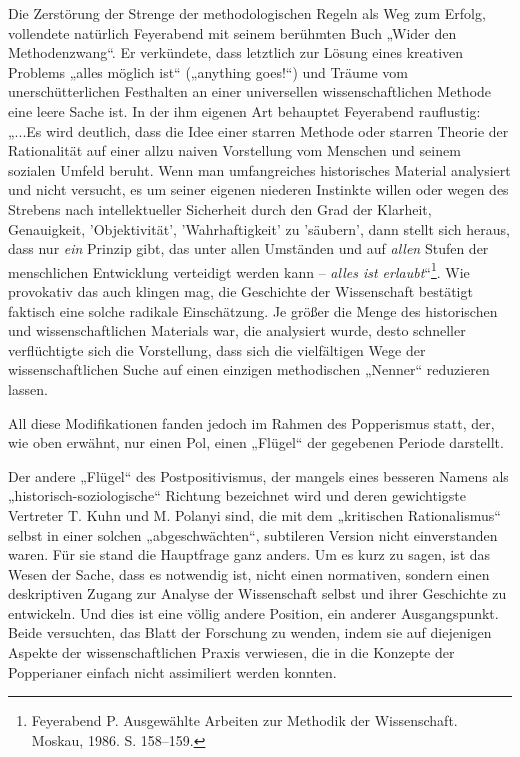 \documentclass[11pt,a4paper]{article}
\begin{document}
Die Zerstörung der Strenge der methodologischen Regeln als Weg zum Erfolg,
vollendete natürlich Feyerabend mit seinem berühmten Buch „Wider den
Methodenzwang“. Er verkün\-dete, dass letztlich zur Lösung eines kreativen
Problems „alles möglich ist“ („anything goes!“) und Träume vom
unerschütterlichen Festhalten an einer universellen wissenschaftlichen Methode
eine leere Sache ist. In der ihm eigenen Art behauptet Feyerabend rauflustig:
„...Es wird deutlich, dass die Idee einer starren Methode oder starren Theorie
der Rationalität auf einer allzu naiven Vorstellung vom Menschen und seinem
sozialen Umfeld beruht. Wenn man umfangreiches historisches Material
analysiert und nicht versucht, es um seiner eigenen niederen Instinkte willen
oder wegen des Strebens nach intellektueller Sicherheit durch den Grad der
Klarheit, Genauigkeit, 'Objektivität', 'Wahrhaftigkeit' zu 'säubern', dann
stellt sich heraus, dass nur \emph{ein} Prinzip gibt, das unter allen
Umständen und auf \emph{allen} Stufen der menschlichen Entwicklung verteidigt
werden kann -- \emph{alles ist erlaubt}“\footnote{Feyerabend P. Ausgewählte
  Arbeiten zur Methodik der Wissenschaft. Moskau, 1986.  S. 158–159.}.  Wie
provokativ das auch klingen mag, die Geschichte der Wissenschaft bestätigt
faktisch eine solche radikale Einschätzung. Je größer die Menge des
historischen und wissenschaftlichen Materials war, die analysiert wurde, desto
schneller verflüchtigte sich die Vorstellung, dass sich die vielfältigen Wege
der wissenschaftlichen Suche auf einen einzigen methodischen „Nenner“
reduzieren lassen.

All diese Modifikationen fanden jedoch im Rahmen des Popperismus statt, der,
wie oben erwähnt, nur einen Pol, einen „Flügel“ der gegebenen Periode
darstellt.

Der andere „Flügel“ des Postpositivismus, der mangels eines besseren Namens
als „historisch-soziologische“ Richtung bezeichnet wird und deren gewichtigste
Vertreter T. Kuhn und M. Polanyi sind, die mit dem „kritischen Rationalismus“
selbst in einer solchen „abgeschwächten“, subtileren Version nicht
einverstanden waren. Für sie stand die Hauptfrage ganz anders.  Um es kurz zu
sagen, ist das Wesen der Sache, dass es notwendig ist, nicht einen normativen,
sondern einen deskriptiven Zugang zur Analyse der Wissenschaft selbst und
ihrer Geschichte zu entwickeln. Und dies ist eine völlig andere Position, ein
anderer Ausgangspunkt. Beide versuchten, das Blatt der Forschung zu wenden,
indem sie auf diejenigen Aspekte der wissenschaftlichen Praxis verwiesen, die
in die Konzepte der Popperianer einfach nicht assimiliert werden konnten.
\end{document}
